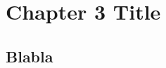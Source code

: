 
\chapter{Chapter 3 Title}
\label{chapter:3}
\minitoc
\newpage
\graphicspath{{2-Chapters/3-Chapter/Images/}}

\section{Blabla}
\label{sec:blabla}

